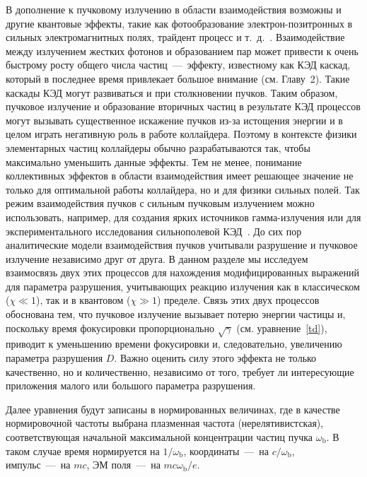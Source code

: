 В дополнение к пучковому излучению в области взаимодействия возможны и другие квантовые эффекты, такие как фотообразование электрон-позитронных в сильных электромагнитных полях, трайдент процесс и т. д.~\cite{chen1989coherent,hartin2018strong}.
Взаимодействие между излучением жестких фотонов и образованием пар может привести к очень быстрому росту общего числа частиц~---~эффекту, известному как КЭД каскад, который в последнее время привлекает большое внимание (см. Главу~2).
Такие каскады КЭД могут развиваться и при столкновении пучков.
Таким образом, пучковое излучение и образование вторичных частиц в результате КЭД процессов могут вызывать существенное искажение пучков из-за истощения энергии и в целом играть негативную роль в работе коллайдера.
Поэтому в контексте физики элементарных частиц коллайдеры обычно разрабатываются так, чтобы максимально уменьшить данные эффекты.
Тем не менее, понимание коллективных эффектов в области взаимодействия имеет решающее значение не только для оптимальной работы коллайдера, но и для физики сильных полей.
Так режим взаимодействия пучков с сильным пучковым излучением можно использовать, например, для создания ярких источников гамма-излучения или для экспериментального исследования сильнополевой КЭД~\cite{del2019bright,song2021generation,tamburini2020efficient}.
До сих пор аналитические модели взаимодействия пучков учитывали разрушение и пучковое излучение независимо друг от друга.
В данном разделе мы исследуем взаимосвязь двух этих процессов для нахождения модифицированных выражений для параметра разрушения, учитывающих реакцию излучения как в классическом ($\chi\ll1$), так и в квантовом ($ \chi\gg1$) пределе.
Связь этих двух процессов обоснована тем, что пучковое излучение вызывает потерю энергии частицы и, поскольку время фокусировки пропорционально $\sqrt{\gamma}$ (см. уравнение~\eqref{td}), приводит к уменьшению времени фокусировки и, следовательно, увеличению параметра разрушения $D$.
Важно оценить силу этого эффекта не только качественно, но и количественно, независимо от того, требует ли интересующие приложения малого или большого параметра разрушения.

Далее уравнения будут записаны в нормированных величинах, где в качестве нормировочной частоты выбрана плазменная частота (нерелятивистская), соответствующая начальной максимальной концентрации частиц пучка $\omega_\mathrm{b}$.
В таком случае время нормируется на $ 1/\omega_\mathrm{b}$, координаты~---~на $c/\omega_\mathrm{b}$, импульс~---~на $mc$, ЭМ поля~---~на $mc\omega_\mathrm{b}/e$.

